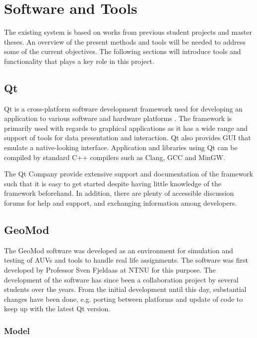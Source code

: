\chapter{Software and Tools}
\label{existing_tech}

The existing system is based on works from previous student projects and master theses. An overview of the present methods and tools will be needed to address some of the current objectives. The following sections will introduce tools and functionality that plays a key role in this project.

\section{Qt}

Qt is a cross-platform software development framework used for developing an application to various software and hardware platforms \cite{qt}. The framework is primarily used with regards to graphical applications as it has a wide range and support of tools for data presentation and interaction. Qt also provides GUI that emulate a native-looking interface. Application and libraries using Qt can be compiled by standard C++ compilers such as Clang, GCC and MinGW. 

The Qt Company provide extensive support and documentation of the framework such that it is easy to get started despite having little knowledge of the framework beforehand. In addition, there are plenty of accessible discussion forums for help and support, and exchanging information among developers.


\section{GeoMod}

The GeoMod software was developed as an environment for simulation and testing of AUVs and tools to handle real life assignments. The software was first developed by Professor Sven Fjeldaas at NTNU for this purpose. The development of the software has since been a collaboration project by several students over the years. From the initial development until this day, substantial changes have been done, e.g. porting between platforms and update of code to keep up with the latest Qt version.


\subsection{Model}
\label{chap:model}

